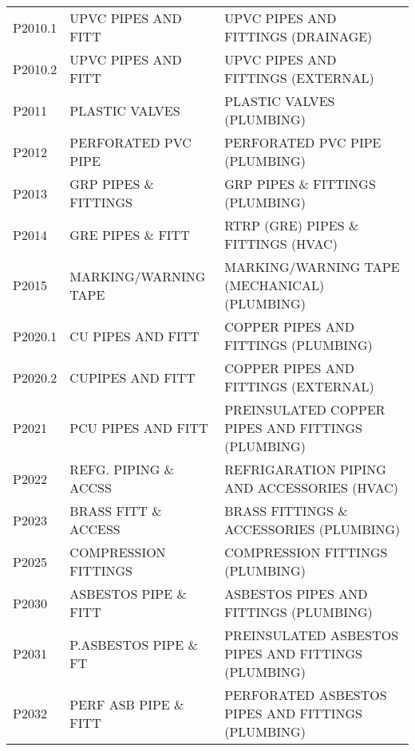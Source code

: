 \begin{longtable}[l]{l%
                  l|%
                  l|}
\rowcolor{thetableheadbgcolor!0.25!white} P2010.1     & UPVC PIPES AND FITT   & UPVC PIPES AND FITTINGS  (DRAINAGE)   \\
\rowcolor{thetableheadbgcolor!0.25!white} P2010.2     & UPVC PIPES AND FITT   & UPVC PIPES AND FITTINGS (EXTERNAL)   \\
\rowcolor{thetableheadbgcolor!0.25!white} P2011       & PLASTIC VALVES   & PLASTIC VALVES (PLUMBING)   \\
\rowcolor{thetableheadbgcolor!0.25!white} P2012       & PERFORATED PVC PIPE   & PERFORATED PVC PIPE (PLUMBING)   \\
\rowcolor{thetableheadbgcolor!0.25!white} P2013       & GRP PIPES \& FITTINGS   & GRP PIPES \& FITTINGS (PLUMBING)   \\
\rowcolor{thetableheadbgcolor!0.25!white} P2014       & GRE PIPES \& FITT   & RTRP (GRE) PIPES \& FITTINGS (HVAC)   \\
\rowcolor{thetableheadbgcolor!0.25!white} P2015       & MARKING/WARNING TAPE   & MARKING/WARNING TAPE (MECHANICAL) (PLUMBING)   \\
\rowcolor{thetableheadbgcolor!0.25!white} P2020.1     & CU PIPES AND FITT   & COPPER PIPES AND FITTINGS (PLUMBING)   \\
\rowcolor{thetableheadbgcolor!0.25!white} P2020.2     & CUPIPES AND FITT   & COPPER PIPES AND FITTINGS (EXTERNAL)   \\
\rowcolor{thetableheadbgcolor!0.25!white} P2021       & PCU PIPES AND FITT   & PREINSULATED COPPER PIPES AND FITTINGS (PLUMBING)   \\
\rowcolor{thetableheadbgcolor!0.25!white} P2022       & REFG. PIPING \& ACCSS   & REFRIGARATION PIPING AND ACCESSORIES (HVAC)   \\
\rowcolor{thetableheadbgcolor!0.25!white} P2023       & BRASS FITT \& ACCESS   & BRASS FITTINGS \& ACCESSORIES (PLUMBING)   \\
\rowcolor{thetableheadbgcolor!0.25!white} P2025       & COMPRESSION FITTINGS   & COMPRESSION FITTINGS (PLUMBING)   \\
\rowcolor{thetableheadbgcolor!0.25!white} P2030       & ASBESTOS PIPE \& FITT   & ASBESTOS PIPES AND FITTINGS (PLUMBING)   \\
\rowcolor{thetableheadbgcolor!0.25!white} P2031       & P.ASBESTOS PIPE \& FT   & PREINSULATED ASBESTOS PIPES AND FITTINGS (PLUMBING)   \\
\rowcolor{thetableheadbgcolor!0.25!white} P2032       & PERF ASB PIPE \& FITT   & PERFORATED ASBESTOS PIPES AND FITTINGS (PLUMBING)   \\

\end{longtable}
